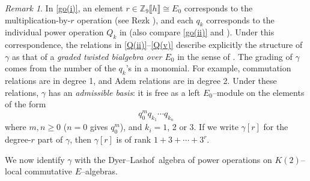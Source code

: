 \documentclass[microtype]{gtpart}     %
\theoremstyle{remark}
\newtheorem{rmk}{Remark}[section]
\theoremstyle{definition}
\newcommand{\mb}[1]{\mathbb{#1}}
\newcommand{\DL}{Dyer--Lashof~}
\newcommand{\BZ}{{\mb Z}}
\newcommand{\g}{\gamma}
\newcommand{\q}[1]{\fullref{prop:Q}\thinspace \eqref{Q(#1)}}
\newcommand{\go}[1]{\fullref{def:go}\thinspace \eqref{go(#1)}}
\begin{document}
\begin{rmk}
\label{rmk:rank}
 In \go{i}, an element $r \in \BZ_9 \llbracket h \rrbracket \cong E_0$ 
 corresponds to the multiplication-by-$r$ operation (see Rezk 
 \cite[discussion following Proposition 6.3]{cong}), and each $q_k$ 
 corresponds to the individual power operation $Q_k$ in  (also 
 compare \go{ii} and ).  Under this correspondence, the relations 
 in \q{ii}--\eqref{Q(v)} describe explicitly the structure of $\g$ as that of 
 a {\em graded twisted bialgebra over $E_0$} in the sense of 
 \cite[Section 5]{cong}.  The grading of $\g$ comes from the number of the 
 $q_k$'s in a monomial.  For example, commutation relations are in degree 1, 
 and Adem relations are in degree 2.  Under these relations, $\g$ has an 
 {\em admissible basis}: it is free as a left $E_0$--module on the elements 
 of the form 
 \[
  q_0^m q_{k_1} \cdots q_{k_n} 
 \]
 where $m, n \geq 0$ ($n = 0$ gives $q_0^m$), and $k_i = 1$, 2 or 3.  If we 
 write $\g[r]$ for the degree-$r$ part of $\g$, then $\g[r]$ is of rank 
 $1 + 3 + \cdots + 3^r$.  
\end{rmk}

We now identify $\g$ with the \DL algebra of power operations on 
$K(2)$--local commutative $E$--algebras.  
\end{document}
